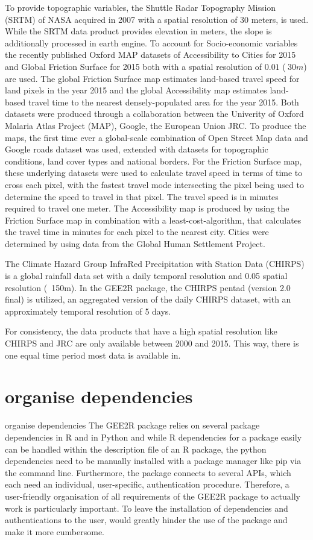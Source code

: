 \documentclass[12pt,twoside,a4paper,final]{report}
\begin{document}
To provide topographic variables, the Shuttle Radar Topography Mission (SRTM) of NASA acquired in 2007 with a spatial resolution of 30 meters, is used. While the SRTM data product provides elevation in meters, the slope is additionally processed in earth engine. To account for Socio-economic variables the recently published Oxford MAP datasets of Accessibility to Cities for 2015 and Global Friction Surface for 2015 both with a spatial resolution of $0.01$ ($~ 30m$) are used. The global Friction Surface map estimates land-based travel speed for land pixels in the year 2015 and the global Accessibility map estimates land-based travel time to the nearest densely-populated area for the year 2015. Both datasets were produced through a collaboration between the Univerity of Oxford Malaria Atlas Project (MAP), Google, the European Union JRC. To produce the maps, the first time ever a global-scale combination of Open Street Map data and Google roads dataset was used, extended with datasets for topographic conditions, land cover types and national borders.
For the Friction Surface map, these underlying datasets were used to calculate travel speed in terms of time to cross each pixel, with the fastest travel mode intersecting the pixel being used to determine the speed to travel in that pixel. The travel speed is in minutes required to travel one meter. The Accessibility map is produced by using the Friction Surface map in combination with a least-cost-algorithm, that calculates the travel time in minutes for each pixel to the nearest city. Cities were determined by using data from the Global Human Settlement Project.  


The Climate Hazard Group InfraRed Precipitation with Station Data (CHIRPS) is a global rainfall data set with a daily temporal resolution and 0.05 spatial resolution (~150m). In the GEE2R package, the CHIRPS pentad (version 2.0 final) is utilized, an aggregated version of the daily CHIRPS dataset, with an approximately temporal resolution of 5 days.

For consistency, the data products that have a high spatial resolution like CHIRPS and JRC are only available between 2000 and 2015. This way, there is one equal time period most data is available in.

\section{organise dependencies}

organise dependencies
The GEE2R package relies on several package dependencies in R and in Python and while R dependencies for a package easily can be handled within the description file of an R package, the python dependencies need to be manually installed with a package manager like pip via the command line. Furthermore, the package connects to several APIs, which each need an individual, user-specific, authentication procedure. Therefore, a user-friendly organisation of all requirements of the GEE2R package to actually work is particularly important. To leave the installation of dependencies and authentications to the user, would greatly hinder the use of the package and make it more cumbersome. 
\end{document}
